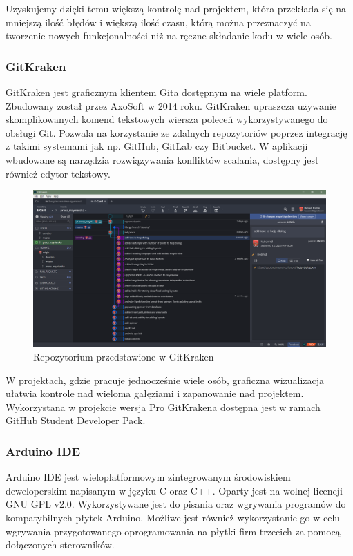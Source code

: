 \documentclass[a4paper,12pt, twoside]{article}
\begin{document}
    	Uzyskujemy dzięki temu większą kontrolę nad projektem, która przekłada się na mniejszą ilość błędów i większą ilość czasu, którą można przeznaczyć na tworzenie nowych funkcjonalności niż na ręczne składanie kodu w wiele osób.\cite{git}
    	
    	\subsubsection{GitKraken}
    	GitKraken jest graficznym klientem Gita dostępnym na wiele platform. Zbudowany został przez AxoSoft w 2014 roku. GitKraken upraszcza używanie skomplikowanych komend tekstowych wiersza poleceń\cite{cli} wykorzystywanego do obsługi Git. Pozwala na korzystanie ze zdalnych repozytoriów poprzez integrację z takimi systemami jak np. GitHub, GitLab czy Bitbucket. W aplikacji wbudowane są narzędzia rozwiązywania konfliktów scalania, dostępny jest również edytor tekstowy.
    	\begin{figure}[H]
    	    \centering
    		\includegraphics[width=1\textwidth]{images/rys2_gitkraken.png}
    		\caption{Repozytorium przedstawione w GitKraken}
            \label{fig:gitkraken}
    	\end{figure}
    		
    	W projektach, gdzie pracuje jednocześnie wiele osób, graficzna wizualizacja ułatwia kontrole nad wieloma gałęziami i zapanowanie nad projektem. Wykorzystana w projekcie wersja Pro GitKrakena dostępna jest w ramach GitHub Student Developer Pack\cite{githubpack}.
    	
    	\subsubsection{Arduino IDE}
    	Arduino IDE jest wieloplatformowym zintegrowanym środowiskiem deweloperskim napisanym w języku C oraz C++. Oparty jest na wolnej licencji GNU GPL v2.0. Wykorzystywane jest do pisania oraz wgrywania programów do kompatybilnych płytek Arduino. Możliwe jest również wykorzystanie go w celu wgrywania przygotowanego oprogramowania na płytki firm trzecich za pomocą dołączonych sterowników. 
    	
\end{document}
